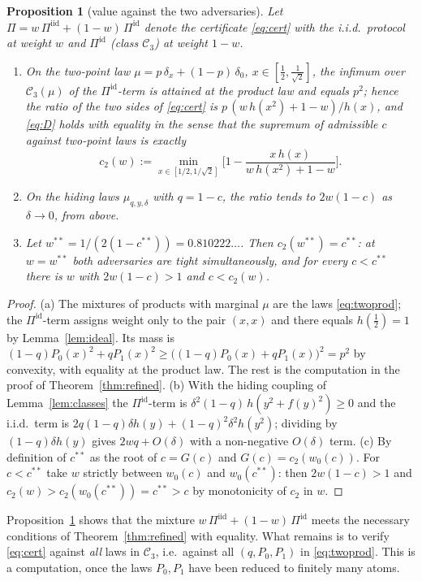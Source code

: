 \documentclass[11pt,a4paper]{article}
\newtheorem{proposition}[theorem]{Proposition}
\theoremstyle{definition}
\theoremstyle{remark}
\newcommand{\cC}{\mathcal{C}}
\newcommand{\ent}{h}
\newcommand{\iid}{\mathrm{iid}}
\newcommand{\id}{\mathrm{id}}
\begin{document}
\begin{proposition}[value against the two adversaries]\label{prop:twoadv}
Let $\Pi=w\,\Pi^{\iid}+(1-w)\,\Pi^{\id}$ denote the certificate \eqref{eq:cert} with the i.i.d.\ protocol at weight $w$ and $\Pi^{\id}$ (class $\cC_3$) at weight $1-w$.
\begin{enumerate}
\item[(a)] On the two-point law $\mu=p\,\delta_x+(1-p)\,\delta_0$, $x\in[\frac12,\frac1{\sqrt2}]$, the infimum over $\cC_3(\mu)$ of the $\Pi^{\id}$-term is attained at the product law and equals $p^2$; hence the ratio of the two sides of \eqref{eq:cert} is $p\,(w\,\ent(x^2)+1-w)/\ent(x)$, and \eqref{eq:D} holds with equality in the sense that the supremum of admissible $c$ against two-point laws is exactly
\[c_2(w):=\min_{x\in[1/2,1/\sqrt2]}\Big[1-\frac{x\,\ent(x)}{w\,\ent(x^2)+1-w}\Big].\]
\item[(b)] On the hiding laws $\mu_{q,y,\delta}$ with $q=1-c$, the ratio tends to $2w(1-c)$ as $\delta\to0$, from above.
\item[(c)] Let $w^{**}=1/(2(1-c^{**}))=0.810222\ldots$. Then $c_2(w^{**})=c^{**}$: at $w=w^{**}$ both adversaries are tight simultaneously, and for every $c<c^{**}$ there is $w$ with $2w(1-c)>1$ and $c<c_2(w)$.
\end{enumerate}
\end{proposition}
\begin{proof}
(a) The mixtures of products with marginal $\mu$ are the laws \eqref{eq:twoprod}; the $\Pi^{\id}$-term assigns weight only to the pair $(x,x)$ and there equals $\ent(\frac12)=1$ by Lemma~\ref{lem:ideal}. Its mass is $(1-q)P_0(x)^2+qP_1(x)^2\ge\big((1-q)P_0(x)+qP_1(x)\big)^2=p^2$ by convexity, with equality at the product law. The rest is the computation in the proof of Theorem~\ref{thm:refined}. (b) With the hiding coupling of Lemma~\ref{lem:classes} the $\Pi^{\id}$-term is $\delta^2(1-q)\,\ent(y^2+f(y)^2)\ge0$ and the i.i.d.\ term is $2q(1-q)\delta\ent(y)+(1-q)^2\delta^2\ent(y^2)$; dividing by $(1-q)\delta\ent(y)$ gives $2wq+O(\delta)$ with a non-negative $O(\delta)$ term. (c) By definition of $c^{**}$ as the root of $c=G(c)$ and $G(c)=c_2(w_0(c))$. For $c<c^{**}$ take $w$ strictly between $w_0(c)$ and $w_0(c^{**})$: then $2w(1-c)>1$ and $c_2(w)>c_2(w_0(c^{**}))=c^{**}>c$ by monotonicity of $c_2$ in $w$.
\end{proof}

Proposition~\ref{prop:twoadv} shows that the mixture $w\,\Pi^{\iid}+(1-w)\,\Pi^{\id}$ meets the necessary conditions of Theorem~\ref{thm:refined} with equality. What remains is to verify \eqref{eq:cert} against \emph{all} laws in $\cC_3$, i.e.\ against all $(q,P_0,P_1)$ in \eqref{eq:twoprod}. This is a computation, once the laws $P_0,P_1$ have been reduced to finitely many atoms.
\end{document}

